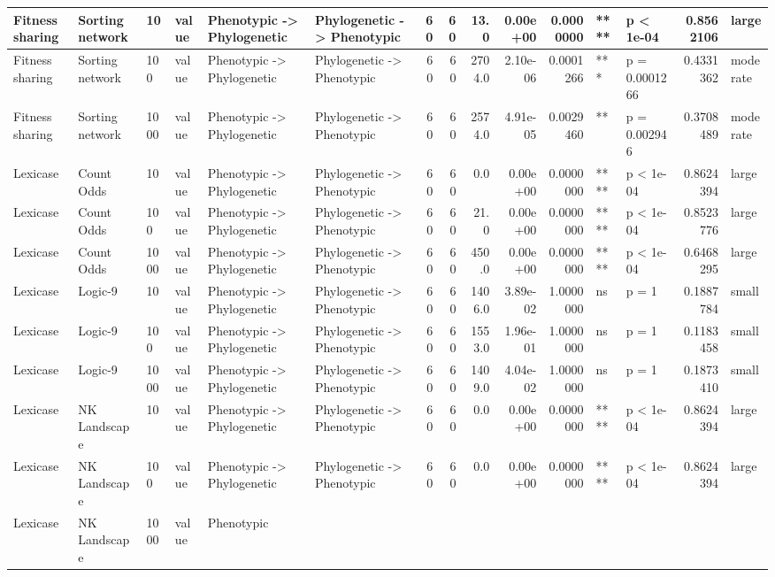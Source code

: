 \documentclass[]{book}
\begin{document}
\begin{table}
\begin{tabular}[t]{l|l|l|l|l|l|r|r|r|r|r|l|l|r|l}
Fitness sharing & Sorting network & 10 & value & Phenotypic
    ->
Phylogenetic & Phylogenetic
    ->
Phenotypic & 60 & 60 & 13.0 & 0.00e+00 & 0.0000000 & **** & p < 1e-04 & 0.8562106 & large\\
\hline
Fitness sharing & Sorting network & 100 & value & Phenotypic
    ->
Phylogenetic & Phylogenetic
    ->
Phenotypic & 60 & 60 & 2704.0 & 2.10e-06 & 0.0001266 & *** & p = 0.0001266 & 0.4331362 & moderate\\
\hline
Fitness sharing & Sorting network & 1000 & value & Phenotypic
    ->
Phylogenetic & Phylogenetic
    ->
Phenotypic & 60 & 60 & 2574.0 & 4.91e-05 & 0.0029460 & ** & p = 0.002946 & 0.3708489 & moderate\\
\hline
Lexicase & Count Odds & 10 & value & Phenotypic
    ->
Phylogenetic & Phylogenetic
    ->
Phenotypic & 60 & 60 & 0.0 & 0.00e+00 & 0.0000000 & **** & p < 1e-04 & 0.8624394 & large\\
\hline
Lexicase & Count Odds & 100 & value & Phenotypic
    ->
Phylogenetic & Phylogenetic
    ->
Phenotypic & 60 & 60 & 21.0 & 0.00e+00 & 0.0000000 & **** & p < 1e-04 & 0.8523776 & large\\
\hline
Lexicase & Count Odds & 1000 & value & Phenotypic
    ->
Phylogenetic & Phylogenetic
    ->
Phenotypic & 60 & 60 & 450.0 & 0.00e+00 & 0.0000000 & **** & p < 1e-04 & 0.6468295 & large\\
\hline
Lexicase & Logic-9 & 10 & value & Phenotypic
    ->
Phylogenetic & Phylogenetic
    ->
Phenotypic & 60 & 60 & 1406.0 & 3.89e-02 & 1.0000000 & ns & p = 1 & 0.1887784 & small\\
\hline
Lexicase & Logic-9 & 100 & value & Phenotypic
    ->
Phylogenetic & Phylogenetic
    ->
Phenotypic & 60 & 60 & 1553.0 & 1.96e-01 & 1.0000000 & ns & p = 1 & 0.1183458 & small\\
\hline
Lexicase & Logic-9 & 1000 & value & Phenotypic
    ->
Phylogenetic & Phylogenetic
    ->
Phenotypic & 60 & 60 & 1409.0 & 4.04e-02 & 1.0000000 & ns & p = 1 & 0.1873410 & small\\
\hline
Lexicase & NK Landscape & 10 & value & Phenotypic
    ->
Phylogenetic & Phylogenetic
    ->
Phenotypic & 60 & 60 & 0.0 & 0.00e+00 & 0.0000000 & **** & p < 1e-04 & 0.8624394 & large\\
\hline
Lexicase & NK Landscape & 100 & value & Phenotypic
    ->
Phylogenetic & Phylogenetic
    ->
Phenotypic & 60 & 60 & 0.0 & 0.00e+00 & 0.0000000 & **** & p < 1e-04 & 0.8624394 & large\\
\hline
Lexicase & NK Landscape & 1000 & value & Phenotypic

\end{tabular}
\end{table}
\end{document}
